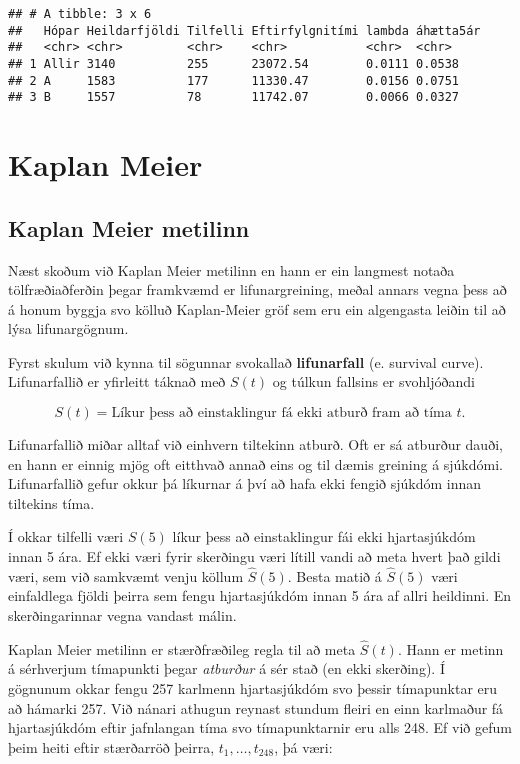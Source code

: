 \documentclass[
]{book}
\begin{document}
\begin{verbatim}
## # A tibble: 3 x 6
##   Hópar Heildarfjöldi Tilfelli Eftirfylgnitími lambda áhætta5ár
##   <chr> <chr>         <chr>    <chr>           <chr>  <chr>    
## 1 Allir 3140          255      23072.54        0.0111 0.0538   
## 2 A     1583          177      11330.47        0.0156 0.0751   
## 3 B     1557          78       11742.07        0.0066 0.0327
\end{verbatim}

\hypertarget{KM}{%
\chapter{Kaplan Meier}\label{KM}}

\hypertarget{kaplan-meier-metilinn}{%
\section{Kaplan Meier metilinn}\label{kaplan-meier-metilinn}}

Næst skoðum við Kaplan Meier metilinn en hann er ein langmest notaða tölfræðiaðferðin þegar framkvæmd er lifunargreining, meðal annars vegna þess að á honum byggja svo kölluð Kaplan-Meier gröf sem eru ein algengasta leiðin til að lýsa lifunargögnum.

Fyrst skulum við kynna til sögunnar svokallað \textbf{lifunarfall} (e. survival curve). Lifunarfallið er yfirleitt táknað með \(S(t)\) og túlkun fallsins er svohljóðandi

\[ 
S(t) = \text{Líkur þess að einstaklingur fá ekki atburð fram að tíma $t$.}
\]

Lifunarfallið miðar alltaf við einhvern tiltekinn atburð. Oft er sá atburður dauði, en hann er einnig mjög oft eitthvað annað eins og til dæmis greining á sjúkdómi. Lifunarfallið gefur okkur þá líkurnar á því að hafa ekki fengið sjúkdóm innan tiltekins tíma.

Í okkar tilfelli væri \(S(5)\) líkur þess að einstaklingur fái ekki hjartasjúkdóm innan 5 ára. Ef ekki væri fyrir skerðingu væri lítill vandi að meta hvert það gildi væri, sem við samkvæmt venju köllum \(\hat S(5)\). Besta matið á \(\hat S(5)\) væri einfaldlega fjöldi þeirra sem fengu hjartasjúkdóm innan 5 ára af allri heildinni. En skerðingarinnar vegna vandast málin.

Kaplan Meier metilinn er stærðfræðileg regla til að meta \(\hat S(t)\). Hann er metinn á sérhverjum tímapunkti þegar \emph{atburður} á sér stað (en ekki skerðing). Í gögnunum okkar fengu 257 karlmenn hjartasjúkdóm svo þessir tímapunktar eru að hámarki 257. Við nánari athugun reynast stundum fleiri en einn karlmaður fá hjartasjúkdóm eftir jafnlangan tíma svo tímapunktarnir eru alls 248. Ef við gefum þeim heiti eftir stærðarröð þeirra, \(t_1, \ldots , t_{248}\), þá væri:
\end{document}
